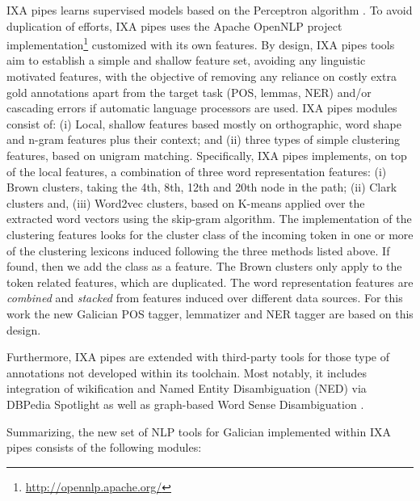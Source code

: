 \documentclass[10pt, a4paper]{article}
\begin{document}
IXA pipes learns supervised models based on the Perceptron algorithm \cite{collins_discriminative_2002}. To avoid duplication of efforts, IXA pipes uses the Apache OpenNLP project implementation\footnote{\url{http://opennlp.apache.org/}} customized with its own features. By design, IXA pipes tools aim to establish a simple and shallow feature set, avoiding any linguistic motivated features, with the objective of removing any reliance on costly extra gold annotations apart from the target task (POS, lemmas, NER) and/or cascading errors if automatic language processors are used. IXA pipes modules consist of: (i) Local, shallow features based mostly on orthographic, word shape and n-gram features plus their context; and (ii) three types of simple clustering features, based on unigram matching. Specifically, IXA pipes implements, on top of the local features, a combination of three word representation features: (i) Brown \cite{brown1992class} clusters, taking the 4th, 8th, 12th and 20th node in the path; (ii) Clark \cite{clark2003combining} clusters and, (iii) Word2vec \cite{mikolov2013distributed} clusters, based on K-means applied over the extracted word vectors using the skip-gram algorithm. The implementation of the clustering features looks for the cluster class of the incoming token in one or more of the clustering lexicons induced following the three methods listed above. If found, then we add the class as a feature. The Brown clusters only apply to the token related features, which are duplicated. The word representation features are \emph{combined} and \emph{stacked} from features induced over different data sources. For this work the new Galician POS tagger, lemmatizer and NER tagger are based on this design.

Furthermore, IXA pipes are extended with third-party tools for those type of annotations not developed within its toolchain. Most notably, it includes integration of wikification and Named Entity Disambiguation (NED) via DBPedia Spotlight \cite{isem2011mendesetal} as well as graph-based Word Sense Disambiguation \cite{Agirre:2014:RWK:2645242.2645245}.

Summarizing, the new set of NLP tools for Galician implemented within IXA pipes consists of the following modules:
\end{document}
